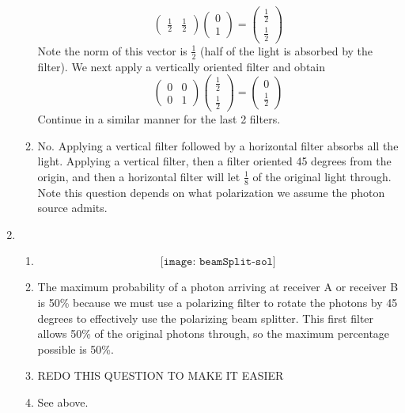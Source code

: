 \documentclass[12pt]{article}
\begin{document}
\begin{enumerate}[font=\bfseries]
\begin{enumerate}
\[\begin{pmatrix}
                \frac{1}{2} & \frac{1}{2}
                \end{pmatrix}
                \begin{pmatrix} 0 \\ 1 \end{pmatrix}
                =
                \begin{pmatrix} \frac{1}{2} \\ \frac{1}{2} \end{pmatrix}
                \]
            Note the norm of this vector is $\frac{1}{2}$ (half of the light is absorbed by the filter). We next apply a vertically oriented filter and obtain
            \[\begin{pmatrix}
                0 & 0 \\
                0 & 1
                \end{pmatrix}
                \begin{pmatrix}
                \frac{1}{2} \\ \frac{1}{2}
                \end{pmatrix}
                =
                \begin{pmatrix} 0 \\ \frac{1}{2} \end{pmatrix}
                \]
            Continue in a similar manner for the last 2 filters.
            \item No. Applying a vertical filter followed by a horizontal filter absorbs all the light. Applying a vertical filter, then a filter oriented 45 degrees from the origin, and then a horizontal filter will let $\frac{1}{8}$ of the original light through. Note this question depends on what polarization we assume the photon source admits. 
    \end{enumerate}
    \item \begin{enumerate}
        \item \[\texttt{[image: beamSplit-sol]}\]
        \item The maximum probability of a photon arriving at receiver A or receiver B is 50\% because we must use a polarizing filter to rotate the photons by 45 degrees to effectively use the polarizing beam splitter. This first filter allows 50\% of the original photons through, so the maximum percentage possible is 50\%.
        \item REDO THIS QUESTION TO MAKE IT EASIER
        \item See above.
    \end{enumerate}

\end{enumerate}
\end{document}
